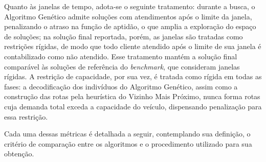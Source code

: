 Quanto às janelas de tempo, adota-se o seguinte tratamento: durante a busca, o
Algoritmo Genético admite soluções com atendimentos após o limite da janela,
penalizando o atraso na função de aptidão, o que amplia a exploração do espaço de
soluções; na solução final reportada, porém, as janelas são tratadas como restrições
rígidas, de modo que todo cliente atendido após o limite de sua janela é contabilizado
como não atendido. Esse tratamento mantém a solução final comparável às soluções de
referência do \textit{benchmark}, que consideram janelas rígidas. A restrição de
capacidade, por sua vez, é tratada como rígida em todas as fases: a decodificação dos
indivíduos do Algoritmo Genético, assim como a construção das rotas pela heurística do
Vizinho Mais Próximo, nunca forma rotas cuja demanda total exceda a capacidade do
veículo, dispensando penalização para essa restrição.

Cada uma dessas métricas é detalhada a seguir, contemplando sua definição, o critério
de comparação entre os algoritmos e o procedimento utilizado para sua obtenção.


